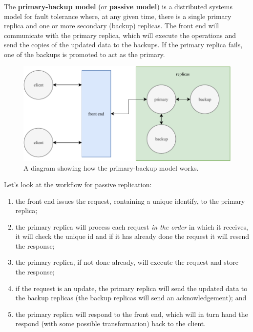 \begin{definition}
    The \textbf{primary-backup model}
    (or \textbf{passive model}) is a distributed systems model for fault tolerance
    where, at any given time, there is a single primary replica
    and one or more secondary (backup) replicas.
    The front end will communicate with the primary replica,
    which will execute the operations and send the copies of the updated data
    to the backups.
    If the primary replica fails, one of the backups is promoted to act as the primary.
\end{definition}

\begin{figure}[]
    \centering
    \includegraphics[width=0.8\linewidth]{images/primary-backup.pdf}
    \caption{A diagram showing how the primary-backup model works.}%
    \label{fig:primary-backup}
\end{figure}

Let's look at the workflow for passive replication:
\begin{enumerate}
    \item the front end issues the request, containing a unique identify,
        to the primary replica;
    \item the primary replica will process each request \emph{in the order} in which
        it receives, it will check the unique id and if it has already done
        the request it will resend the response;
    \item the primary replica, if not done already, will execute the request and
        store the response;
    \item if the request is an update, the primary replica will send
        the updated data to the backup replicas
        (the backup replicas will send an acknowledgement); and
    \item the primary replica will respond to the front end, which will
        in turn hand the respond (with some possible transformation)
        back to the client.
\end{enumerate}

